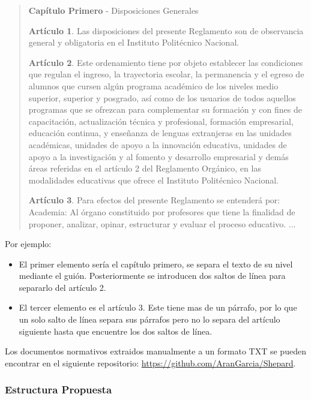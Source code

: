 \begin{quote}
    \textbf{Capítulo Primero} - Disposiciones Generales
    
    \textbf{Artículo 1}. Las disposiciones del presente Reglamento son de observancia general y obligatoria en el Instituto Politécnico Nacional.
    
    \textbf{Artículo 2}. Este ordenamiento tiene por objeto establecer las condiciones que regulan el ingreso, la trayectoria escolar, la permanencia y el egreso de alumnos que cursen algún programa académico de los niveles medio superior, superior y posgrado, así como de los usuarios de todos aquellos programas que se ofrezcan para complementar su formación y con fines de capacitación, actualización técnica y profesional, formación empresarial, educación continua, y enseñanza de lenguas extranjeras en las unidades académicas, unidades de apoyo a la innovación educativa, unidades de apoyo a la investigación y al fomento y desarrollo empresarial y demás áreas referidas en el artículo 2 del Reglamento Orgánico, en las modalidades educativas que ofrece el Instituto Politécnico Nacional.
    
    \textbf{Artículo 3}. Para efectos del presente Reglamento se entenderá por:
    Academia: Al órgano constituido por profesores que tiene la finalidad de proponer, analizar, opinar, estructurar y evaluar el proceso educativo.
    ...
\end{quote}

Por ejemplo:

\begin{itemize}
    \item El primer elemento sería el capítulo primero, se separa el texto de su nivel mediante el guión. Posteriormente se introducen dos saltos de línea para separarlo del artículo 2. 
    \item El tercer elemento es el artículo 3. Este tiene mas de un párrafo, por lo que un solo salto de línea separa sus párrafos pero no lo separa del artículo siguiente hasta que encuentre los dos saltos de línea.
\end{itemize}

Los documentos normativos extraidos manualmente a un formato TXT se pueden encontrar en el siguiente repositorio: \url{https://github.com/AranGarcia/Shepard}.

\subsubsection{Estructura Propuesta}

